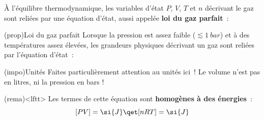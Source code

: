 \documentclass[../../main/main.tex]{subfiles}
\begin{document}
À l'équilibre thermodynamique, les variables d'état $P$, $V$, $T$ et $n$
décrivant le gaz sont reliées par une équation d'état, aussi appelée \textbf{loi
	du gaz parfait}~:
\begin{tcb*}[label=prop](prop){Loi du gaz parfait}
	Lorsque la pression est assez faible ($\lesssim \SI{1}{bar}$) et à des
	températures assez élevées, les grandeurs physiques décrivant un gaz
	sont reliées par l'équation d'état~:
	\smallbreak
	\begin{isd}
		\vspace{-15pt}
		\tcblower
		\vspace{-15pt}
	\end{isd}
\end{tcb*}

\begin{tcb*}(impo){Unités}
	Faites particulièrement attention au unités ici~! Le volume n'est pas en
	litres, ni la pression en bars !
\end{tcb*}

\begin{tcb}(rema)<lftt>{}
	Les termes de cette équation sont \textbf{homogènes à des
		énergies}~:
	\[
		[PV] = \si{J}
		\qet
		[nRT] = \si{J}
	\]
\end{tcb}
\end{document}
